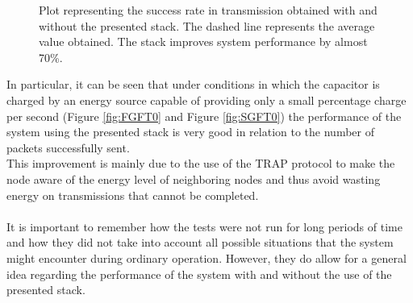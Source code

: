 \begin{figure}[H]
\centerline{}
\caption{\footnotesize \centering Plot representing the success rate in transmission obtained with and without the presented stack. The dashed line represents the average value obtained. The stack improves system performance by almost 70\%.}
\label{fig:FTA}
\end{figure}

In particular, it can be seen that under conditions in which the capacitor is charged by an energy source capable of providing only a small percentage charge per second (Figure \ref{fig:FGFT0} and Figure \ref{fig:SGFT0}) the performance of the system using the presented stack is very good in relation to the number of packets successfully sent.\\
This improvement is mainly due to the use of the TRAP protocol to make the node aware of the energy level of neighboring nodes and thus avoid wasting energy on transmissions that cannot be completed.\\\\
It is important to remember how the tests were not run for long periods of time and how they did not take into account all possible situations that the system might encounter during ordinary operation. However, they do allow for a general idea regarding the performance of the system with and without the use of the presented stack.
\newpage




